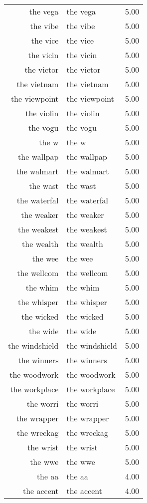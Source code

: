 \begin{table}[ht]
\begin{tabular}{rlr}
  the vega & the vega & 5.00 \\ 
  the vibe & the vibe & 5.00 \\ 
  the vice & the vice & 5.00 \\ 
  the vicin & the vicin & 5.00 \\ 
  the victor & the victor & 5.00 \\ 
  the vietnam & the vietnam & 5.00 \\ 
  the viewpoint & the viewpoint & 5.00 \\ 
  the violin & the violin & 5.00 \\ 
  the vogu & the vogu & 5.00 \\ 
  the w & the w & 5.00 \\ 
  the wallpap & the wallpap & 5.00 \\ 
  the walmart & the walmart & 5.00 \\ 
  the wast & the wast & 5.00 \\ 
  the waterfal & the waterfal & 5.00 \\ 
  the weaker & the weaker & 5.00 \\ 
  the weakest & the weakest & 5.00 \\ 
  the wealth & the wealth & 5.00 \\ 
  the wee & the wee & 5.00 \\ 
  the wellcom & the wellcom & 5.00 \\ 
  the whim & the whim & 5.00 \\ 
  the whisper & the whisper & 5.00 \\ 
  the wicked & the wicked & 5.00 \\ 
  the wide & the wide & 5.00 \\ 
  the windshield & the windshield & 5.00 \\ 
  the winners & the winners & 5.00 \\ 
  the woodwork & the woodwork & 5.00 \\ 
  the workplace & the workplace & 5.00 \\ 
  the worri & the worri & 5.00 \\ 
  the wrapper & the wrapper & 5.00 \\ 
  the wreckag & the wreckag & 5.00 \\ 
  the wrist & the wrist & 5.00 \\ 
  the wwe & the wwe & 5.00 \\ 
  the aa & the aa & 4.00 \\ 
  the accent & the accent & 4.00 \\ 

\end{tabular}
\end{table}
